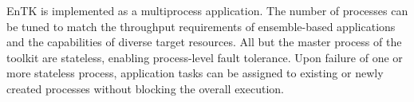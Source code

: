 EnTK is implemented as a multiprocess application. The number of
processes can be tuned to match the throughput requirements of ensemble-based
applications and the capabilities of diverse target resources. All but the
master process of the toolkit are stateless, enabling process-level fault
tolerance. Upon failure of one or more stateless process, application tasks
can be assigned to existing or newly created processes without blocking the
overall execution. 



